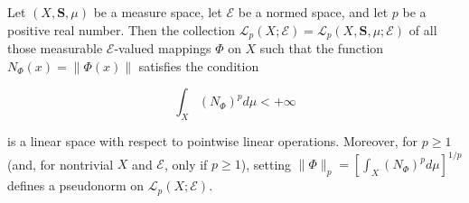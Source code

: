 Let $(X, \mathbf{S}, \mu)$ be a measure space, let $\mathcal{E}$ be a normed space, and let $p$ be a positive real number. Then the collection $\mathcal{L}_p(X; \mathcal{E}) = \mathcal{L}_p(X, \mathbf{S}, \mu; \mathcal{E})$ of all those measurable $\mathcal{E}$-valued mappings $\Phi$ on $X$ such that the function $N_{\Phi}(x) = \|\Phi(x)\|$ satisfies the condition

$$\int_X (N_{\Phi})^p d\mu < +\infty$$

is a linear space with respect to pointwise linear operations. Moreover, for $p \geq 1$ (and, for nontrivial $X$ and $\mathcal{E}$, only if $p \geq 1$), setting $\|\Phi\|_p = [\int_X (N_{\Phi})^p d\mu]^{1/p}$ defines a pseudonorm on $\mathcal{L}_p(X; \mathcal{E})$.
